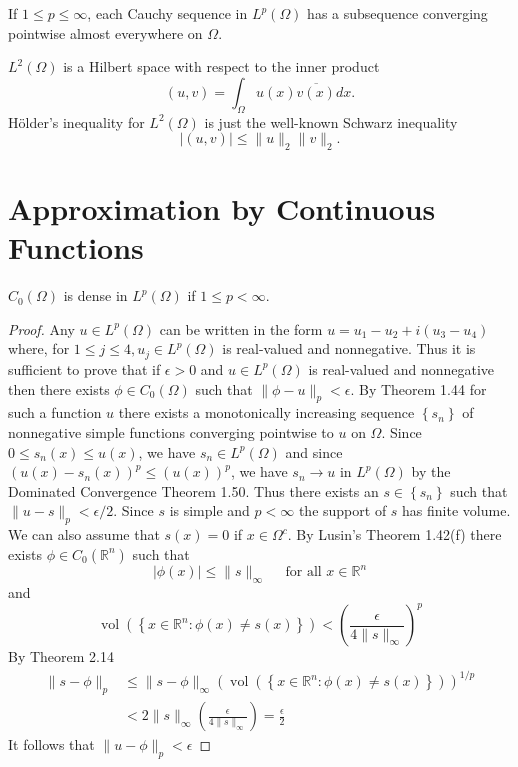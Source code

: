 \begin{corollary}
  If $1 \leq p \leq \infty$, each Cauchy sequence in $L^p(\Omega)$ has a subsequence converging pointwise almost everywhere on $\Omega$.
\end{corollary}


\begin{corollary}
  $L^2(\Omega)$ is a Hilbert space with respect to the inner product
  \[
  (u, v)=\int_{\Omega} u(x) \overline{v(x)} d x .
  \]
  Hölder's inequality for $L^2(\Omega)$ is just the well-known Schwarz inequality
  \[
  |(u, v)| \leq\|u\|_2\|v\|_2 .
  \]
\end{corollary}


\section{Approximation by Continuous Functions}

\begin{theorem}
  $C_0(\Omega)$ is dense in $L^p(\Omega)$ if $1 \leq p<\infty$.
\end{theorem}

\begin{proof}
  Any $u \in L^p(\Omega)$ can be written in the form $u=u_1-u_2+i\left(u_3-u_4\right)$ where, for $1 \leq j \leq 4, u_j \in L^p(\Omega)$ is real-valued and nonnegative. Thus it is sufficient to prove that if $\epsilon>0$ and $u \in L^p(\Omega)$ is real-valued and nonnegative then there exists $\phi \in C_0(\Omega)$ such that $\|\phi-u\|_p<\epsilon$. By Theorem 1.44 for such a function $u$ there exists a monotonically increasing sequence $\left\{s_n\right\}$ of nonnegative simple functions converging pointwise to $u$ on $\Omega$. Since $0 \leq s_n(x) \leq u(x)$, we have $s_n \in L^p(\Omega)$ and since $\left(u(x)-s_n(x)\right)^p \leq(u(x))^p$, we have $s_n \rightarrow u$ in $L^p(\Omega)$ by the Dominated Convergence Theorem 1.50. Thus there exists an $s \in\left\{s_n\right\}$ such
  that $\|u-s\|_p<\epsilon / 2$. Since $s$ is simple and $p<\infty$ the support of $s$ has finite volume. We can also assume that $s(x)=0$ if $x \in \Omega^c$. By Lusin's Theorem 1.42(f) there exists $\phi \in C_0(\mathbb{R}^n)$ such that
  \[
  |\phi(x)| \leq\|s\|_{\infty} \quad \text { for all } x \in \mathbb{R}^n
  \]
  and
  \[
  \operatorname{vol}\left(\left\{x \in \mathbb{R}^n: \phi(x) \neq s(x)\right\}\right)<\left(\frac{\epsilon}{4\|s\|_{\infty}}\right)^p
  \]
  By Theorem 2.14
  \[
  \begin{aligned}
  \|s-\phi\|_p & \leq\|s-\phi\|_{\infty}\left(\operatorname{vol}\left(\left\{x \in \mathbb{R}^n: \phi(x) \neq s(x)\right\}\right)\right)^{1 / p} \\
  & <2\|s\|_{\infty}\left(\frac{\epsilon}{4\|s\|_{\infty}}\right)=\frac{\epsilon}{2}
  \end{aligned}
  \]
  It follows that $\|u-\phi\|_p<\epsilon$
\end{proof}

